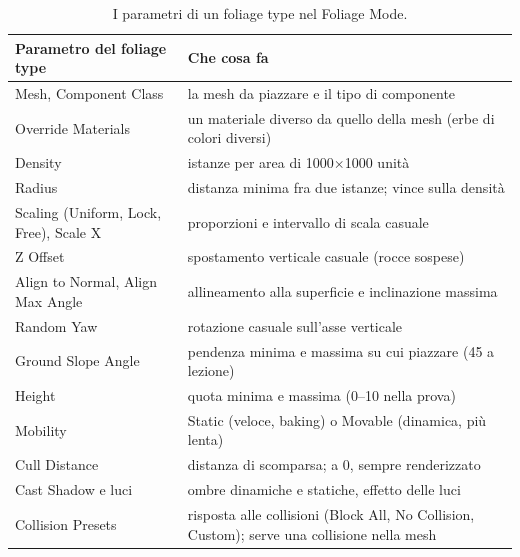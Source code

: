 \begin{table}[htbp]
\centering
\small
\begin{tabular}{@{}p{4.0cm}p{10.0cm}@{}}
\toprule
\textbf{Parametro del foliage type} & \textbf{Che cosa fa} \\
\midrule
Mesh, Component Class & la mesh da piazzare e il tipo di componente \\
Override Materials & un materiale diverso da quello della mesh (erbe di colori diversi) \\
Density & istanze per area di 1000$\times$1000 unità \\
Radius & distanza minima fra due istanze; vince sulla densità \\
Scaling (Uniform, Lock, Free), Scale X & proporzioni e intervallo di scala casuale \\
Z Offset & spostamento verticale casuale (rocce sospese) \\
Align to Normal, Align Max Angle & allineamento alla superficie e inclinazione massima \\
Random Yaw & rotazione casuale sull'asse verticale \\
Ground Slope Angle & pendenza minima e massima su cui piazzare (45 a lezione) \\
Height & quota minima e massima (0--10 nella prova) \\
Mobility & Static (veloce, baking) o Movable (dinamica, più lenta) \\
Cull Distance & distanza di scomparsa; a 0, sempre renderizzato \\
Cast Shadow e luci & ombre dinamiche e statiche, effetto delle luci \\
Collision Presets & risposta alle collisioni (Block All, No Collision, Custom); serve una
collisione nella mesh \\
\bottomrule
\end{tabular}
\caption{I parametri di un foliage type nel Foliage Mode.}
\label{ue15:tab:parametrifoliage}
\end{table}

